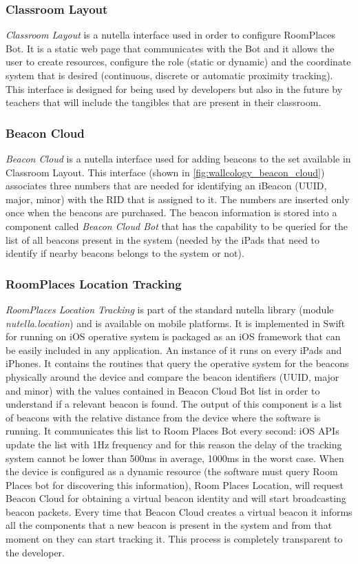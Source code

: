 \subsubsection{Classroom Layout}
\textit{Classroom Layout} is a nutella interface used in order to configure RoomPlaces Bot. It is a static web page that communicates with the Bot and it allows the user to create resources, configure the role (static or dynamic) and the coordinate system that is desired (continuous, discrete or automatic proximity tracking). This interface is designed for being used by developers but also in the future by teachers that will include the tangibles that are present in their classroom.

\subsubsection{Beacon Cloud}
\textit{Beacon Cloud} is a nutella interface used for adding beacons to the set available in Classroom Layout. This interface (shown in \ref{fig:wallcology_beacon_cloud}) associates three numbers that are needed for identifying an iBeacon (UUID, major, minor) with the RID that is assigned to it. The numbers are inserted only once when the beacons are purchased. The beacon information is stored into a component called \textit{Beacon Cloud Bot} that has the capability to be queried for the list of all beacons present in the system (needed by the iPads that need to identify if nearby beacons belongs to the system or not).

\subsubsection{RoomPlaces Location Tracking}
\textit{RoomPlaces Location Tracking} is part of the standard nutella library (module \textit{nutella.location}) and is available on mobile platforms. It is implemented in Swift for running on iOS operative system is packaged as an iOS framework that can be easily included in any application. An instance of it runs on every iPads and iPhones. It contains the routines that query the operative system for the beacons physically around the device and compare the beacon identifiers (UUID, major and minor) with the values contained in Beacon Cloud Bot list in order to understand if a relevant beacon is found. The output of this component is a list of beacons with the relative distance from the device where the software is running. It communicates this list to Room Places Bot every second: iOS APIs update the list with 1Hz frequency and for this reason the delay of the tracking system cannot be lower than 500ms in average, 1000ms in the worst case. When the device is configured as a dynamic resource (the software must query Room Places bot for discovering this information), Room Places Location, will request Beacon Cloud for obtaining a virtual beacon identity and will start broadcasting beacon packets. Every time that Beacon Cloud creates a virtual beacon it informs all the components that a new beacon is present in the system and from that moment on they can start tracking it. This process is completely transparent to the developer.


